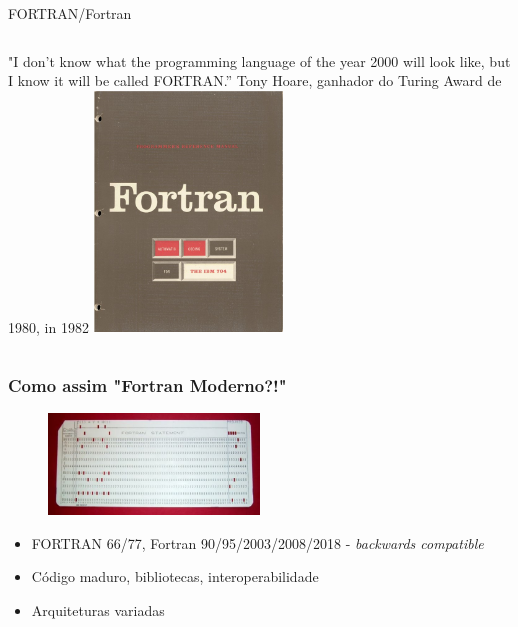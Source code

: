 \documentclass{beamer}
\begin{document}
\begin{darkframes}
  \begin{frame}{FORTRAN/Fortran}
    \begin{columns}
      "I don’t know what the programming language of the year 2000 will look like, but I know it will be called FORTRAN.”
      \vfill
      \textemdash  Tony Hoare, ganhador do Turing Award de 1980, in 1982
      \includegraphics[width=5cm]{figures/Fortran_acs_cover.jpeg}
    \end{columns}
  \end{frame}
  
  \begin{frame}[label=fortranslide]
    \frametitle{Como assim "Fortran Moderno?!"}
    \begin{figure}
      \centering
      \includegraphics[width=0.5\textwidth]{figures/FortranCardPROJ039.jpg}
    \end{figure}
    \begin{itemize}
    \item FORTRAN 66/77, Fortran 90/95/2003/2008/2018 - \emph{backwards compatible}
    \item Código maduro, bibliotecas, interoperabilidade
    \item Arquiteturas variadas
    \end{itemize}
  \end{frame}
  

\end{darkframes}
\end{document}
